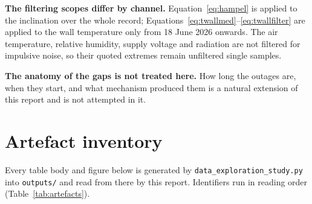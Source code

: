 \documentclass[11pt,a4paper]{article}
\begin{document}
\textbf{The filtering scopes differ by channel.} Equation~\eqref{eq:hampel} is applied to the inclination over the whole record; Equations~\eqref{eq:twallmed}--\eqref{eq:twallfilter} are applied to the wall temperature only from 18 June 2026 onwards. The air temperature, relative humidity, supply voltage and radiation are not filtered for impulsive noise, so their quoted extremes remain unfiltered single samples.

\textbf{The anatomy of the gaps is not treated here.} How long the outages are, when they start, and what mechanism produced them is a natural extension of this report and is not attempted in it.

\section{Artefact inventory}

Every table body and figure below is generated by \texttt{data\_exploration\_study.py} into \texttt{outputs/} and read from there by this report. Identifiers run in reading order (Table~\ref{tab:artefacts}).
\end{document}
